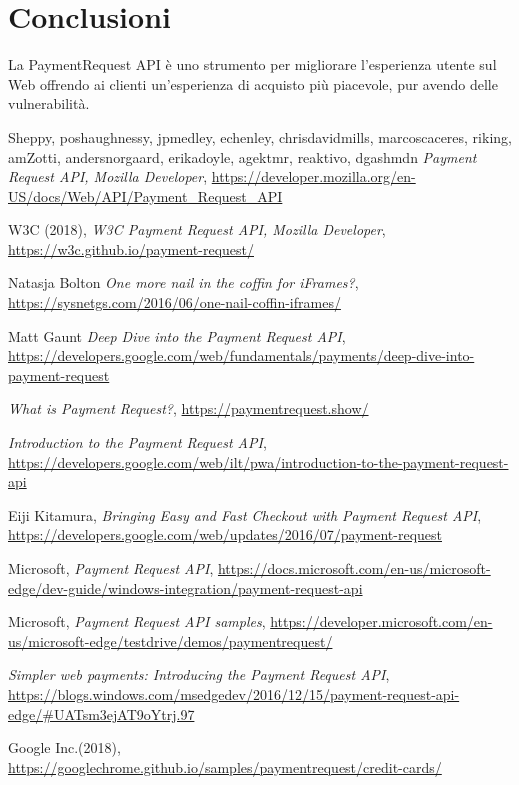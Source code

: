 \documentclass[11pt ,a4paper , twoside , openright ]{article}
\begin{document}
	\section{Conclusioni}
	La PaymentRequest API è uno strumento per migliorare l'esperienza utente sul Web offrendo ai clienti un'esperienza di acquisto più piacevole, pur avendo delle vulnerabilità.
	\newpage
	\listoffigures
	\newpage
	\begin{thebibliography}{99}
		\bibitem{}
		Sheppy, poshaughnessy, jpmedley, echenley, chrisdavidmills, marcoscaceres, riking, amZotti, andersnorgaard, erikadoyle, agektmr, reaktivo, dgashmdn
		\emph{Payment Request API, Mozilla Developer},
		\url{https://developer.mozilla.org/en-US/docs/Web/API/Payment_Request_API}
		
		\bibitem{}
		W3C (2018),
		\emph{W3C Payment Request API, Mozilla Developer},
		\url{https://w3c.github.io/payment-request/}
		
		\bibitem{}
		Natasja Bolton
		\emph{One more nail in the coffin for iFrames?}, 
		\url{https://sysnetgs.com/2016/06/one-nail-coffin-iframes/}
		
		\bibitem{}
		Matt Gaunt
		\emph{Deep Dive into the Payment Request API}, 
		\url{https://developers.google.com/web/fundamentals/payments/deep-dive-into-payment-request}
		
		\bibitem{}
		\emph{What is Payment Request?},
		\url{https://paymentrequest.show/}
		
		\bibitem{}
		\emph{Introduction to the Payment Request API},
		\url{https://developers.google.com/web/ilt/pwa/introduction-to-the-payment-request-api}
		
		\bibitem{}
		Eiji Kitamura,
		\emph{Bringing Easy and Fast Checkout with Payment Request API},
		\url{https://developers.google.com/web/updates/2016/07/payment-request}
		
		\bibitem{}
		Microsoft,
		\emph{Payment Request API},
		\url{https://docs.microsoft.com/en-us/microsoft-edge/dev-guide/windows-integration/payment-request-api}
		
		\bibitem{}
		Microsoft,
		\emph{Payment Request API samples},
		\url{https://developer.microsoft.com/en-us/microsoft-edge/testdrive/demos/paymentrequest/}
		
		\bibitem{}
		\emph{Simpler web payments: Introducing the Payment Request API},
		\url{https://blogs.windows.com/msedgedev/2016/12/15/payment-request-api-edge/#UATsm3ejAT9oYtrj.97}
		
		\bibitem{}
		Google Inc.(2018),
		\url{https://googlechrome.github.io/samples/paymentrequest/credit-cards/}
	\end{thebibliography}
\end{document}
